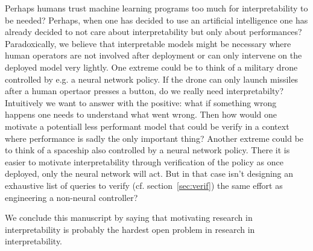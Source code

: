 Perhaps humans trust machine learning programs too much for interpretability to be needed?
Perhaps, when one has decided to use an artificial intelligence one has already decided to not care about interpretability but only about performances?
Paradoxically, we believe that interpretable models might be necessary where human operators are not involved after deployment or can only intervene on the deployed model very lightly.
One extreme could be to think of a military drone controlled by e.g. a neural network policy. If the drone can only launch missiles after a human opertaor presses a button, do we really need interpretabilty?
Intuitively we want to answer with the positive: what if something wrong happens one needs to understand what went wrong.
Then how would one motivate a potentiall less performant model that could be verify in a context where performance is sadly the only important thing?
Another extreme could be to think of a spaceship also controlled by a neural network policy. There it is easier to motivate interpretability through verification of the policy as once deployed, only the neural network will act.
But in that case isn't designing an exhaustive list of queries to verify (cf. section~\ref{sec:verif}) the same effort as engineering a non-neural controller?

We conclude this manuscript by saying that motivating research in interpretability is probably the hardest open problem in research in interpretability.
